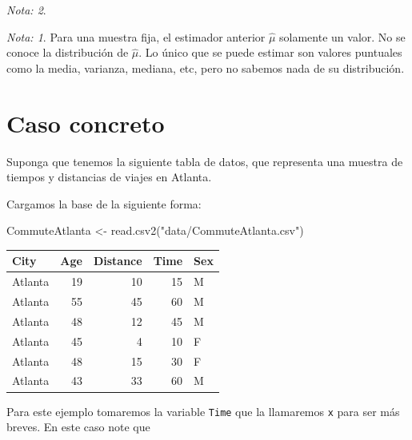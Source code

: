 \documentclass[
  12pt,
]{book}
\newenvironment{Shaded}{\begin{snugshade}}{\end{snugshade}}
\newcommand{\FunctionTok}[1]{\textcolor[rgb]{0.00,0.00,0.00}{#1}}
\newcommand{\NormalTok}[1]{#1}
\newcommand{\OtherTok}[1]{\textcolor[rgb]{0.56,0.35,0.01}{#1}}
\newcommand{\SpecialCharTok}[1]{\textcolor[rgb]{0.00,0.00,0.00}{#1}}
\newcommand{\StringTok}[1]{\textcolor[rgb]{0.31,0.60,0.02}{#1}}
\theoremstyle{definition}
\theoremstyle{definition}
\theoremstyle{definition}
\theoremstyle{remark}
\newtheorem*{remark}{Nota: }
\begin{document}
\begin{remark}
\begin{remark}

{}Para una muestra fija, el estimador anterior \(\hat{\mu}\)
solamente un valor. No se conoce la distribución de \(\hat{\mu}\). Lo
único que se puede estimar son valores puntuales como la media,
varianza, mediana, etc, pero no sabemos nada de su distribución.

\end{remark}
\end{remark}

\hypertarget{caso-concreto}{%
\section{Caso concreto}\label{caso-concreto}}

Suponga que tenemos la siguiente tabla de datos, que representa una
muestra de tiempos y distancias de viajes en Atlanta.

Cargamos la base de la siguiente forma:

\begin{Shaded}
\begin{Highlighting}[]
\NormalTok{CommuteAtlanta }\OtherTok{\textless{}{-}} \FunctionTok{read.csv2}\NormalTok{(}\StringTok{"data/CommuteAtlanta.csv"}\NormalTok{)}
\end{Highlighting}
\end{Shaded}

\begin{tabular}{l|r|r|r|l}
\hline
City & Age & Distance & Time & Sex\\
\hline
Atlanta & 19 & 10 & 15 & M\\
\hline
Atlanta & 55 & 45 & 60 & M\\
\hline
Atlanta & 48 & 12 & 45 & M\\
\hline
Atlanta & 45 & 4 & 10 & F\\
\hline
Atlanta & 48 & 15 & 30 & F\\
\hline
Atlanta & 43 & 33 & 60 & M\\
\hline
\end{tabular}

Para este ejemplo tomaremos la variable \texttt{Time} que la
llamaremos \texttt{x} para ser más breves. En este caso note que

\begin{Shaded}
\end{Shaded}
\end{document}
